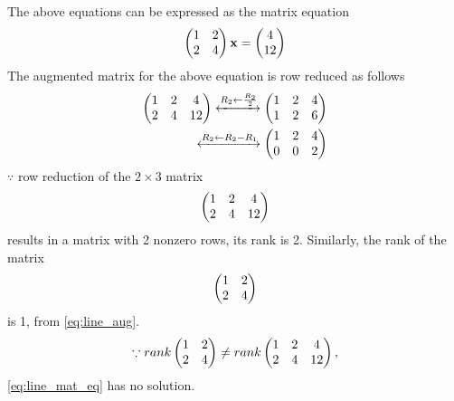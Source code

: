
		The above equations can be expressed as the matrix equation
\begin{align}
\begin{pmatrix} 1 & 2\\2 & 4\end{pmatrix} \mathbf{x} = \begin{pmatrix} 4\\12\end{pmatrix}
\end{align}
%
The augmented matrix for the above equation is row reduced as follows
\begin{align}
\begin{pmatrix} 1 & 2 & 4\\2 & 4 & 12\end{pmatrix} 
\xleftrightarrow {R_2\leftarrow \frac{R_2}{2}}\begin{pmatrix} 1 & 2 & 4\\1 & 2 & 6\end{pmatrix} 
\\
\xleftrightarrow {R_2\leftarrow R_2 - R_1}\begin{pmatrix} 1 & 2 & 4\\0 & 0 & 2\end{pmatrix} 
\label{eq:line_aug}
\end{align}
%
$\because$ row reduction of the $2\times 3$ matrix
%
\begin{align}
\begin{pmatrix} 1 & 2 & 4\\2 & 4 & 12\end{pmatrix} 
\end{align}
%
results in a matrix with 2 nonzero rows, its rank is 2.  Similarly, the rank of the matrix 
%
\begin{align}
\begin{pmatrix} 1 & 2\\2 & 4\end{pmatrix} 
\end{align}
is 1, from \ref{eq:line_aug}. 
%
\begin{align}
\because rank \begin{pmatrix} 1 & 2\\2 & 4\end{pmatrix} \ne rank\begin{pmatrix} 1 & 2 & 4\\2 & 4 & 12\end{pmatrix},  
\end{align}
%
\eqref{eq:line_mat_eq} has no solution.
